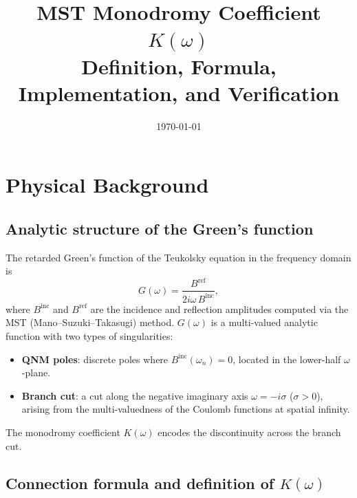 \documentclass[12pt,a4paper]{article}
\title{MST Monodromy Coefficient \texorpdfstring{$K(\omega)$}{K(omega)}\\
\large Definition, Formula, Implementation, and Verification}
\author{}
\date{\today}
\newcommand{\Binc}{B^{\mathrm{inc}}}
\newcommand{\Bref}{B^{\mathrm{ref}}}
\begin{document}
\maketitle
\tableofcontents
\bigskip

\section{Physical Background}

\subsection{Analytic structure of the Green's function}

The retarded Green's function of the Teukolsky equation in the frequency domain is
\begin{equation}
  G(\omega) = \frac{\Bref}{2i\omega\,\Binc},
  \label{eq:Green}
\end{equation}
where $\Binc$ and $\Bref$ are the incidence and reflection amplitudes computed
via the MST (Mano--Suzuki--Takasugi) method.
$G(\omega)$ is a multi-valued analytic function with two types of singularities:
\begin{itemize}
  \item \textbf{QNM poles}: discrete poles where $\Binc(\omega_n) = 0$, located in
        the lower-half $\omega$-plane.
  \item \textbf{Branch cut}: a cut along the negative imaginary axis $\omega = -i\sigma$
        ($\sigma > 0$), arising from the multi-valuedness of the Coulomb functions
        at spatial infinity.
\end{itemize}
The monodromy coefficient $K(\omega)$ encodes the discontinuity across the branch cut.

\subsection{Connection formula and definition of \texorpdfstring{$K(\omega)$}{K(omega)}}
\end{document}
